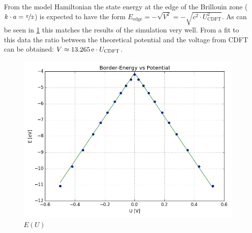 From the model Hamiltonian the state energy at the edge of the Brillouin zone ($k\cdot a = \nicefrac{\pi}{2}$) is expected to have the form $E_\text{edge} = -\sqrt{V^2} = -\sqrt{c^2\cdot U_\text{CDFT}^2}$. As can be seen in \cref{image_hydrogen_border_energy_potential} this matches the results of the simulation very well. From a fit to this data the ratio between the theoretical potential and the voltage from CDFT can be obtained: $V \approx \unit[13.265]{e} \cdot U_\text{CDFT}$.

\begin{figure}
	\centering
	\includegraphics[width = 12cm]{Images/Hydrogen/hydrogen_border_energy}
	\caption{$E(U)$}
	\label{image_hydrogen_border_energy_potential}
\end{figure}

